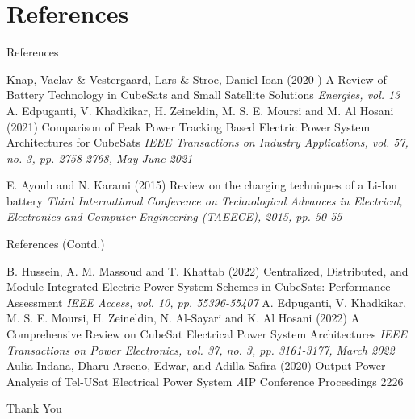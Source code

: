 \documentclass[aspectratio=169]{beamer}
\begin{document}
		\section{References}
		\begin{frame}{References}
			
			\begin{thebibliography}{9}
				
				Knap, Vaclav \& Vestergaard, Lars \& Stroe, Daniel-Ioan (2020	)
				\newblock A Review of Battery Technology in CubeSats
				and Small Satellite Solutions
				\newblock \emph{Energies, vol. 13}	
				A. Edpuganti, V. Khadkikar, H. Zeineldin, M. S. E. Moursi and M. Al Hosani (2021)
				\newblock Comparison of Peak Power Tracking Based Electric Power System Architectures for CubeSats
				\newblock \emph{IEEE Transactions on Industry Applications, vol. 57, no. 3, pp. 2758-2768, May-June 2021}
				
				E. Ayoub and N. Karami (2015)
				\newblock Review on the charging techniques of a Li-Ion battery
				\newblock \emph{Third International Conference on Technological Advances in Electrical, Electronics and Computer Engineering (TAEECE), 2015, pp. 50-55}
			\end{thebibliography}
		\end{frame}
		\begin{frame}{References (Contd.)}
			
			\begin{thebibliography}{9}
				
				\bibitem[4]{p1}
				B. Hussein, A. M. Massoud and T. Khattab (2022)
				\newblock Centralized, Distributed, and Module-Integrated Electric Power System Schemes in CubeSats: Performance Assessment
				\newblock \emph{ IEEE Access, vol. 10, pp. 55396-55407}
				A. Edpuganti, V. Khadkikar, M. S. E. Moursi, H. Zeineldin, N. Al-Sayari and K. Al Hosani (2022)
				\newblock A Comprehensive Review on CubeSat Electrical Power System Architectures
				\newblock \emph { IEEE Transactions on Power Electronics, vol. 37, no. 3, pp. 3161-3177, March 2022}
				\bibitem[6]{p1}
				Aulia Indana, Dharu Arseno, Edwar, and Adilla Safira (2020)
				\newblock Output Power Analysis of Tel-USat Electrical Power System 
				\newblock \emph  AIP Conference Proceedings 2226
				
				
				
				
				
				
				
				
				
				
			\end{thebibliography}
		\end{frame}
		
		\begin{frame}
			\huge \center Thank You
			
		\end{frame}
	
\end{document}
